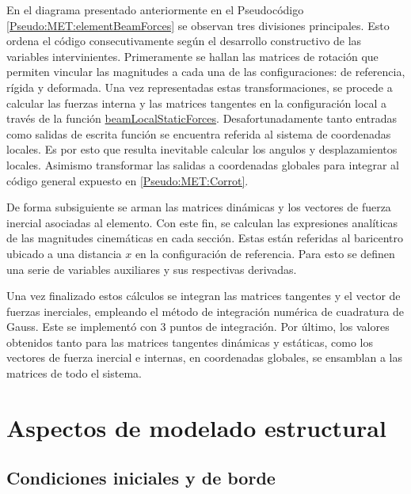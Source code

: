 En el diagrama presentado anteriormente en el Pseudocódigo \ref{Pseudo:MET:elementBeamForces} se observan tres divisiones principales. Esto ordena el código consecutivamente según el desarrollo constructivo de las variables intervinientes. Primeramente se hallan las matrices de rotación que permiten vincular las magnitudes a cada una de las configuraciones: de referencia, rígida y deformada. Una vez representadas estas transformaciones, se procede a calcular las fuerzas interna y las matrices tangentes en la configuración local a través de la función \href{https://github.com/ONSAS/ONSAS/blob/master/src/beamLocalStaticForces.m}{beamLocalStaticForces}. Desafortunadamente tanto entradas como salidas de escrita función se encuentra referida al sistema de coordenadas locales. Es por esto que resulta inevitable calcular los angulos y desplazamientos locales. Asimismo transformar las salidas a coordenadas globales para integrar al código general expuesto en \ref{Pseudo:MET:Corrot}.

De forma subsiguiente se arman las matrices dinámicas y los vectores de fuerza inercial asociadas al elemento. Con este fin, se calculan las expresiones analíticas de las magnitudes cinemáticas en cada sección. Estas están referidas al baricentro ubicado a una distancia $x$ en la configuración de referencia.  Para esto se definen una serie de variables auxiliares y sus  respectivas derivadas.  

Una vez finalizado estos cálculos se integran las matrices tangentes y el vector de fuerzas inerciales, empleando el método de integración numérica de cuadratura de Gauss. Este se implementó con 3 puntos de integración. Por último, los valores obtenidos tanto para las matrices tangentes dinámicas y estáticas,  como los vectores de fuerza inercial e internas, en coordenadas globales, se ensamblan a las matrices de todo el sistema.
 
\section{Aspectos de modelado estructural}
\subsection{Condiciones iniciales y de borde}


